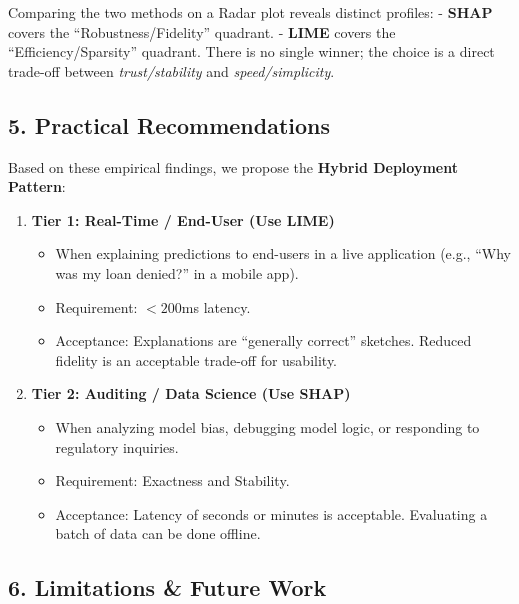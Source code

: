 \documentclass[
]{article}
\providecommand{\tightlist}{%
  \setlength{\itemsep}{0pt}\setlength{\parskip}{0pt}}
\begin{document}
Comparing the two methods on a Radar plot reveals distinct profiles: -
\textbf{SHAP} covers the ``Robustness/Fidelity'' quadrant. -
\textbf{LIME} covers the ``Efficiency/Sparsity'' quadrant. There is no
single winner; the choice is a direct trade-off between
\emph{trust/stability} and \emph{speed/simplicity}.

\hypertarget{practical-recommendations}{%
\subsection{5. Practical
Recommendations}\label{practical-recommendations}}

Based on these empirical findings, we propose the \textbf{Hybrid
Deployment Pattern}:

\begin{enumerate}
\def\labelenumi{\arabic{enumi}.}
\tightlist
\item
  \textbf{Tier 1: Real-Time / End-User (Use LIME)}

  \begin{itemize}
  \tightlist
  \item
    When explaining predictions to end-users in a live application
    (e.g., ``Why was my loan denied?'' in a mobile app).
  \item
    Requirement: \(< 200\)ms latency.
  \item
    Acceptance: Explanations are ``generally correct'' sketches. Reduced
    fidelity is an acceptable trade-off for usability.
  \end{itemize}
\item
  \textbf{Tier 2: Auditing / Data Science (Use SHAP)}

  \begin{itemize}
  \tightlist
  \item
    When analyzing model bias, debugging model logic, or responding to
    regulatory inquiries.
  \item
    Requirement: Exactness and Stability.
  \item
    Acceptance: Latency of seconds or minutes is acceptable. Evaluating
    a batch of data can be done offline.
  \end{itemize}
\end{enumerate}

\hypertarget{limitations-future-work}{%
\subsection{6. Limitations \& Future
Work}\label{limitations-future-work}}
\end{document}
